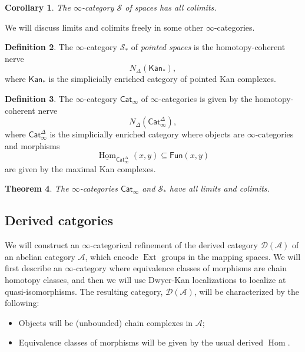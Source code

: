 \documentclass[10pt, oneside]{memoir}
\newtheorem{thm}{Theorem}[subsection]
\newtheorem{cor}[thm]{Corollary}
\theoremstyle{definition}
\newtheorem{defn}[thm]{Definition}
\theoremstyle{remark}
\theoremstyle{plain}
\theoremstyle{definition}
\theoremstyle{remark}
\newcommand{\mc}[1]{\mathcal{#1}}
\newcommand{\ms}[1]{\mathsf{#1}}
\newcommand{\ul}[1]{\underline{#1}}
\newcommand{\1}{\mathbf{1}}
\newcommand{\2}{\mathbf{2}}
\newcommand{\3}{\mathbf{3}}
\DeclareMathOperator{\Hom}{Hom}
\DeclareMathOperator{\Ext}{Ext}
\begin{document}
\begin{cor}
    The \(\infty \)-category \(\mc{S} \) of spaces has all colimits.
\end{cor}

We will discuss limits and colimits freely in some other \(\infty \)-categories.
\begin{defn}
    The \(\infty \)-category \(\mc{S}_* \) of \textit{pointed spaces} is the homotopy-coherent nerve
    \[ N_{\Delta}(\ms{Kan}_*), \]
    where \(\ms{Kan}_* \) is the simplicially enriched category of pointed Kan complexes.
\end{defn}

\begin{defn}
    The \(\infty \)-category \(\ms{Cat}_{\infty} \) of \(\infty \)-categories is given by the homotopy-coherent nerve
    \[ N_{\Delta}(\ms{Cat}_{\infty}^{\Delta}), \]
    where \(\ms{Cat}_{\infty}^{\Delta} \) is the simplicially enriched category where objects are \(\infty \)-categories and morphisms
    \[ \ul{\Hom}_{\ms{Cat}_{\infty}^{\Delta}}(x,y) \subseteq \ms{Fun}(x,y) \]
    are given by the maximal Kan complexes.
\end{defn}

\begin{thm}
    The \(\infty \)-categories \(\ms{Cat}_{\infty} \) and \(\mc{S}_* \) have all limits and colimits.
\end{thm}


\subsection{Derived catgories}%
\label{sub:Derived catgories}

We will construct an \(\infty \)-categorical refinement of the derived category \(\mc{D}(\mc{A}) \) of an abelian category \(\mc{A} \), which encode \(\Ext \) groups in the mapping spaces. We will first describe an \(\infty \)-category where equivalence classes of morphisms are chain homotopy classes, and then we will use Dwyer-Kan localizations to localize at quasi-isomorphisms. The resulting category, \(\mc{D}(\mc{A}) \), will be characterized by the following:
\begin{itemize}
    \item Objects will be (unbounded) chain complexes in \(\mc{A} \);
    \item Equivalence classes of morphisms will be given by the usual derived \(\Hom \).
\end{itemize}
\end{document}
